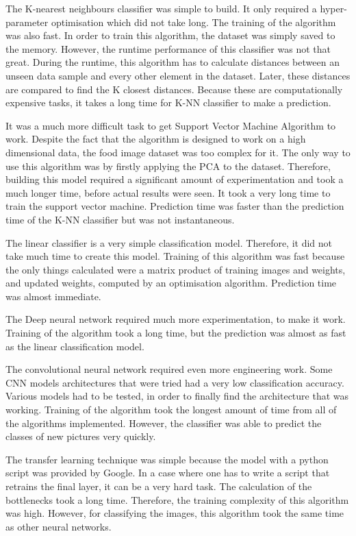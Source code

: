 The K-nearest neighbours classifier was simple to build. It only required a hyper-parameter optimisation which did not take long. The training of the algorithm was also fast. In order to train this algorithm, the dataset was simply saved to the memory. However, the runtime performance of this classifier was not that great. During the runtime, this algorithm has to calculate distances between an unseen data sample and every other element in the dataset. Later, these distances are compared to find the K closest distances. Because these are computationally expensive tasks, it takes a long time for K-NN classifier to make a prediction.

It was a much more difficult task to get Support Vector Machine Algorithm to work. Despite the fact that the algorithm is designed to work on a high dimensional data,  the food image dataset was too complex for it. The only way to use this algorithm was by firstly applying the PCA to the dataset. Therefore, building this model required a significant amount of experimentation and took a much longer time, before actual results were seen. It took a very long time to train the support vector machine. Prediction time was faster than the prediction time of the K-NN classifier but was not instantaneous.

The linear classifier is a very simple classification model. Therefore, it did not take much time to create this model. Training of this algorithm was fast because the only things calculated were a matrix product of training images and weights, and updated weights, computed by an optimisation algorithm. Prediction time was almost immediate.

The Deep neural network required much more experimentation, to make it work. Training of the algorithm took a long time, but the prediction was almost as fast as the linear classification model.

The convolutional neural network required even more engineering work. Some CNN models architectures that were tried had a very low classification accuracy. Various models had to be tested, in order to finally find the architecture that was working.  Training of the algorithm took the longest amount of time from all of the algorithms implemented. However, the classifier was able to predict the classes of new pictures very quickly.

The transfer learning technique was simple because the model with a python script was provided by Google. In a case where one has to write a script that retrains the final layer,  it can be a very hard task. The calculation of the bottlenecks took a long time. Therefore, the training complexity of this algorithm was high.  However, for classifying the images, this algorithm took the same time as other neural networks.

